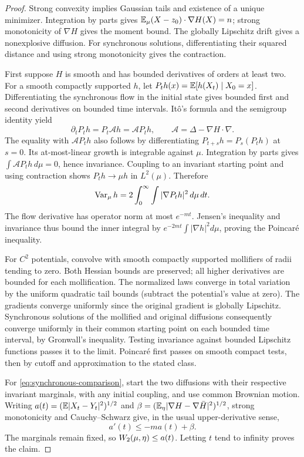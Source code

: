 \begin{proof}
Strong convexity implies Gaussian tails and existence of a
unique minimizer. Integration by parts gives
\(\mathbb E_\mu (X-z_0)\cdot\nabla H(X)=n\); strong monotonicity
of \(\nabla H\) gives the moment bound.
The globally Lipschitz drift gives a nonexplosive diffusion.
For synchronous solutions, differentiating their squared
distance and using strong monotonicity gives the contraction.

First suppose \(H\) is smooth and has bounded derivatives of
orders at least two. For a smooth compactly supported \(h\),
let \(P_th(x)=\mathbb E[h(X_t)\mid X_0=x]\).
Differentiating the synchronous flow in the initial state
gives bounded first and second derivatives on bounded time
intervals. It\^o's formula and the semigroup identity yield
\[
 \partial_tP_th=P_t\mathcal Ah=\mathcal AP_th,
 \qquad \mathcal A=\Delta-\nabla H\cdot\nabla.
\]
The equality with \(\mathcal AP_th\) also follows by
differentiating \(P_{t+s}h=P_s(P_th)\) at \(s=0\).
Its at-most-linear growth is integrable against \(\mu\).
Integration by parts gives
\(\int\mathcal AP_th\,d\mu=0\), hence invariance.
Coupling to an invariant starting point and using contraction
shows \(P_th\to\mu h\) in \(L^2(\mu)\). Therefore
\[
 \operatorname{Var}_\mu h=2\int_0^\infty
                \int|\nabla P_th|^2\,d\mu\,dt.
\]
The flow derivative has operator norm at most \(e^{-mt}\).
Jensen's inequality and invariance thus bound the inner
integral by \(e^{-2mt}\int|\nabla h|^2d\mu\), proving
the Poincar\'e inequality.

For \(C^2\) potentials, convolve with smooth compactly
supported mollifiers of radii tending to zero. Both Hessian
bounds are preserved; all higher derivatives are bounded
for each mollification. The normalized laws converge in
total variation by the uniform quadratic tail bounds
(subtract the potential's value at zero).
The gradients converge uniformly since the original
gradient is globally Lipschitz. Synchronous solutions of
the mollified and original diffusions consequently converge
uniformly in their common starting point on each bounded
time interval, by Gronwall's inequality. Testing invariance
against bounded Lipschitz functions passes it to the limit.
Poincar\'e first passes on smooth compact tests, then by
cutoff and approximation to the stated class.

For \eqref{eq:synchronous-comparison}, start the two
diffusions with their respective invariant marginals,
with any initial coupling, and use common Brownian motion.
Writing \(a(t)=(\mathbb E|X_t-Y_t|^2)^{1/2}\) and
\(\beta=(\mathbb E_\eta|\nabla H-\nabla\bar H|^2)^{1/2}\),
strong monotonicity and Cauchy--Schwarz give, in the usual
upper-derivative sense,
\[
                         a'(t)\le-ma(t)+\beta.
\]
The marginals remain fixed, so \(W_2(\mu,\eta)\le a(t)\).
Letting \(t\) tend to infinity proves the claim.
\end{proof}

